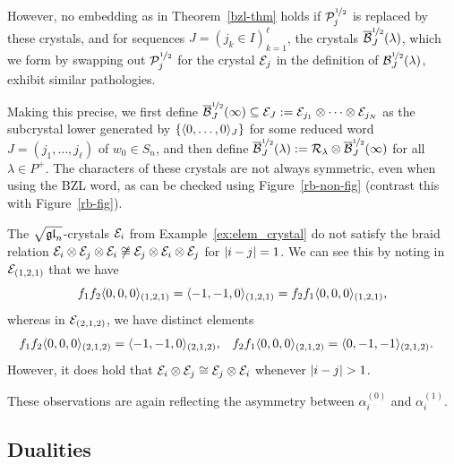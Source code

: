 \documentclass[11pt]{article}
\begin{document}
However, no embedding as in Theorem~\ref{bzl-thm} holds if $\sqrtE_j$ is replaced by these crystals, and for sequences $J = (j_k \in I)_{k=1}^{\ell}$, the crystals $\overline \cB_{J}^{\halfpower}(\lambda)$, which we form by swapping out $\sqrtE_j$ for the crystal $\cE_j$ in the definition of $\cB_{J}^{\halfpower}(\lambda)$, exhibit similar pathologies.

\begin{remark}
Making this precise, we first define $\overline{\cB}^{\halfpower}_J(\infty) \subseteq \cE_J := \cE_{j_1} \otimes \cdots \otimes \cE_{j_N}$ as the subcrystal lower generated by $\{\elem{J}{0,\dotsc,0}\}$ for some reduced word $J = (j_1, \dotsc, j_{\ell})$ of  $w_0 \in S_n$, and then define $\overline{\cB}^{\halfpower}_J(\lambda) := \cR_{\lambda} \otimes \overline{\cB}^{\halfpower}_J(\infty)$ for all $\lambda \in P^+$.
The characters of these crystals are not always symmetric, even when using the BZL word, as can be checked using Figure~\ref{rb-non-fig} (contrast this with Figure~\ref{rb-fig}).
\end{remark}

\begin{example}
The $\sqgln$-crystals $\cE_i$ from Example~\ref{ex:elem_crystal} do not satisfy the braid relation $\cE_i \otimes \cE_j \otimes \cE_i \not\iso \cE_j \otimes \cE_i \otimes \cE_j$ for $\abs{i - j} = 1$.
We can see this by noting in $\cE_{(1,2,1)}$ that we have
\[
f_1 f_2 \elem{(1,2,1)}{0,0,0} = \elem{(1,2,1)}{-1,-1,0} = f_2 f_1 \elem{(1,2,1)}{0,0,0},
\]
whereas in $\cE_{(2,1,2)}$, we have distinct elements
\begin{align*}
f_1 f_2 \elem{(2,1,2)}{0,0,0} & = \elem{(2,1,2)}{-1,-1,0},
& %
f_2 f_1 \elem{(2,1,2)}{0,0,0} & = \elem{(2,1,2)}{0,-1,-1}.
\end{align*}
However, it does hold that $\cE_i \otimes \cE_j \iso \cE_j \otimes \cE_i$ whenever $\abs{i - j} > 1$.
\end{example}

These observations are again reflecting the asymmetry between $\alpha_i^{(0)}$ and $\alpha_i^{(1)}$.


\subsection{Dualities}
\label{sec:dualities}
\end{document}
